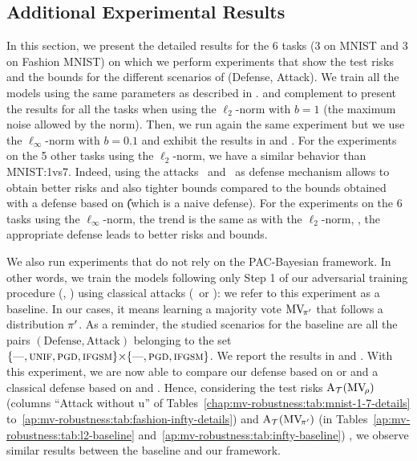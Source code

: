 \begin{noaddcontents}
\section{Additional Experimental Results}
\label{ap:mv-robustness:sec:additional-results}
In this section, we present the detailed results for the 6 tasks (3 on MNIST and 3 on Fashion MNIST) on which we perform experiments that show the test risks and the bounds for the different scenarios of (Defense, Attack).
We train all the models using the same parameters as described in .
 and  complement  to present the results for all the tasks when using the $\ell_2$-norm with $b=1$ (the maximum noise allowed by the norm).
Then, we run again the same experiment but we use the $\ell_\infty$-norm with $b=0.1$ and exhibit the results in  and .
For the experiments on the 5 other tasks using the $\ell_2$-norm, we have a similar behavior than MNIST:1vs7.
Indeed, using the attacks \PGDU~and \IFGSMU~as defense mechanism allows to obtain better risks and also tighter bounds compared to the bounds obtained with a defense based on \U (which is a naive defense).
For the experiments on the 6 tasks using the $\ell_\infty$-norm, the trend is the same as with the $\ell_2$-norm, \ie, the appropriate defense leads to better risks and bounds.

We also run experiments that do not rely on the PAC-Bayesian framework.
In other words, we train the models following only Step 1 of our adversarial training procedure (\ie, ) using classical attacks (\PGD~or \IFGSM): we refer to this experiment as a baseline.
In our cases, it means learning a majority vote $\text{MV}_{\!\pi'}$ that follows a distribution $\pi'$.
As a reminder, the studied scenarios for the baseline are all the pairs $(\text{Defense}, \text{Attack})$ belonging to the set $\{\text{---},\text{{\sc unif}}, \text{{\sc pgd}}, \text{{\sc ifgsm}} \}{\times}\{\text{---}, \text{{\sc pgd}}, \text{{\sc ifgsm}}\}$.
We report the results in  and .
With this experiment, we are now able to compare our defense based on \PGDU or \IFGSMU and a classical defense based on \PGD and \IFGSM.
Hence, considering the test risks $\text{A}_{\mathcal{T}}(\text{MV}_{\!\rho})$ (columns ``Attack without {\sc u}'' of Tables~\ref{chap:mv-robustness:tab:mnist-1-7-details} to~\ref{ap:mv-robustness:tab:fashion-infty-details}) and $\text{A}_{\mathcal{T}}(\text{MV}_{\!\pi'})$ (in Tables~\ref{ap:mv-robustness:tab:l2-baseline} and~\ref{ap:mv-robustness:tab:infty-baseline}) , we observe similar results between the baseline and our framework.








\end{noaddcontents}